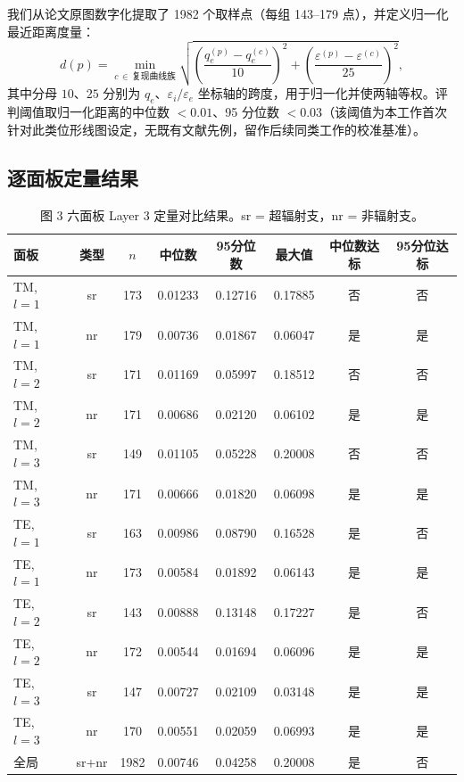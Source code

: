\documentclass[12pt]{ctexart}
\begin{document}
我们从论文原图数字化提取了 1982 个取样点（每组 143--179 点），并定义归一化最近距离度量：
\begin{equation}
d(p) = \min_{c\,\in\,\text{复现曲线族}} \sqrt{ \left(\frac{q_e^{(p)}-q_e^{(c)}}{10}\right)^2 + \left(\frac{\varepsilon^{(p)}-\varepsilon^{(c)}}{25}\right)^2 },
\end{equation}
其中分母 $10$、$25$ 分别为 $q_e$、$\varepsilon_i/\varepsilon_e$ 坐标轴的跨度，用于归一化并使两轴等权。评判阈值取归一化距离的中位数 $<0.01$、95 分位数 $<0.03$（该阈值为本工作首次针对此类位形线图设定，无既有文献先例，留作后续同类工作的校准基准）。

\subsection{逐面板定量结果}

\begin{table}[H]
\centering
\caption{图 3 六面板 Layer 3 定量对比结果。sr = 超辐射支，nr = 非辐射支。}
\label{tab:layer3}
\small
\begin{tabular}{lccccccc}
\toprule
面板 & 类型 & $n$ & 中位数 & 95分位数 & 最大值 & 中位数达标 & 95分位达标 \\
\midrule
TM, $l=1$ & sr & 173 & 0.01233 & 0.12716 & 0.17885 & 否 & 否 \\
TM, $l=1$ & nr & 179 & 0.00736 & 0.01867 & 0.06047 & 是 & 是 \\
TM, $l=2$ & sr & 171 & 0.01169 & 0.05997 & 0.18512 & 否 & 否 \\
TM, $l=2$ & nr & 171 & 0.00686 & 0.02120 & 0.06102 & 是 & 是 \\
TM, $l=3$ & sr & 149 & 0.01105 & 0.05228 & 0.20008 & 否 & 否 \\
TM, $l=3$ & nr & 171 & 0.00666 & 0.01820 & 0.06098 & 是 & 是 \\
TE, $l=1$ & sr & 163 & 0.00986 & 0.08790 & 0.16528 & 是 & 否 \\
TE, $l=1$ & nr & 173 & 0.00584 & 0.01892 & 0.06143 & 是 & 是 \\
TE, $l=2$ & sr & 143 & 0.00888 & 0.13148 & 0.17227 & 是 & 否 \\
TE, $l=2$ & nr & 172 & 0.00544 & 0.01694 & 0.06096 & 是 & 是 \\
TE, $l=3$ & sr & 147 & 0.00727 & 0.02109 & 0.03148 & 是 & 是 \\
TE, $l=3$ & nr & 170 & 0.00551 & 0.02059 & 0.06993 & 是 & 是 \\
\midrule
全局 & sr+nr & 1982 & 0.00746 & 0.04258 & 0.20008 & 是 & 否 \\
\bottomrule
\end{tabular}
\end{table}
\end{document}
